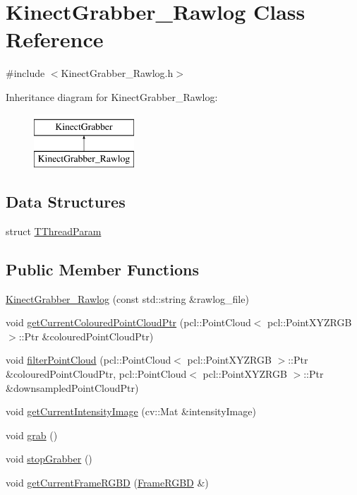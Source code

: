 \hypertarget{class_kinect_grabber___rawlog}{
\section{KinectGrabber\_\-Rawlog Class Reference}
\label{class_kinect_grabber___rawlog}
}


{\ttfamily \#include $<$KinectGrabber\_\-Rawlog.h$>$}

Inheritance diagram for KinectGrabber\_\-Rawlog:\begin{figure}[H]
\begin{center}
\leavevmode
\includegraphics[height=2.000000cm]{class_kinect_grabber___rawlog}
\end{center}
\end{figure}
\subsection*{Data Structures}
\begin{DoxyCompactItemize}
\item 
struct \hyperlink{struct_kinect_grabber___rawlog_1_1_t_thread_param}{TThreadParam}
\end{DoxyCompactItemize}
\subsection*{Public Member Functions}
\begin{DoxyCompactItemize}
\item 
\hyperlink{class_kinect_grabber___rawlog_abd7e578bb31953eb6e2eb39543319f62}{KinectGrabber\_\-Rawlog} (const std::string \&rawlog\_\-file)
\item 
void \hyperlink{class_kinect_grabber___rawlog_a111bd24662e2dcf4ab3ee82a26a089b6}{getCurrentColouredPointCloudPtr} (pcl::PointCloud$<$ pcl::PointXYZRGB $>$::Ptr \&colouredPointCloudPtr)
\item 
void \hyperlink{class_kinect_grabber___rawlog_a91322ecfdf2706e9fa160679e49c9960}{filterPointCloud} (pcl::PointCloud$<$ pcl::PointXYZRGB $>$::Ptr \&colouredPointCloudPtr, pcl::PointCloud$<$ pcl::PointXYZRGB $>$::Ptr \&downsampledPointCloudPtr)
\item 
void \hyperlink{class_kinect_grabber___rawlog_aa3f3757bb08b3453661084e1439c73e6}{getCurrentIntensityImage} (cv::Mat \&intensityImage)
\item 
void \hyperlink{class_kinect_grabber___rawlog_a1eac54348c1963bd5823337b72e10583}{grab} ()
\item 
void \hyperlink{class_kinect_grabber___rawlog_a17b718e8d4142965a84f8bedad738834}{stopGrabber} ()
\item 
void \hyperlink{class_kinect_grabber___rawlog_aa5633577a641a2f4f22dcc92bae059c3}{getCurrentFrameRGBD} (\hyperlink{class_frame_r_g_b_d}{FrameRGBD} \&)
\end{DoxyCompactItemize}
